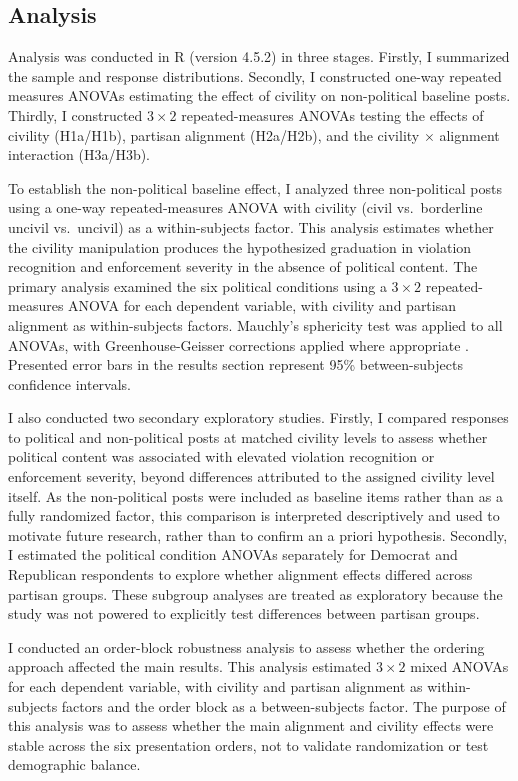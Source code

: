 \documentclass[12pt]{article}
\begin{document}
\subsection{Analysis}

Analysis was conducted in R (version 4.5.2) in three stages. Firstly, I summarized the sample and response distributions. Secondly, I constructed one-way repeated measures ANOVAs estimating the effect of civility on non-political baseline posts. Thirdly, I constructed $3\times2$ repeated-measures ANOVAs testing the effects of civility (H1a/H1b), partisan alignment (H2a/H2b), and the civility $\times$ alignment interaction (H3a/H3b).

To establish the non-political baseline effect, I analyzed three non-political posts using a one-way repeated-measures ANOVA with civility (civil vs.\ borderline uncivil vs.\ uncivil) as a within-subjects factor. This analysis estimates whether the civility manipulation produces the hypothesized graduation in violation recognition and enforcement severity in the absence of political content. The primary analysis examined the six political conditions using a $3\times2$ repeated-measures ANOVA for each dependent variable, with civility and partisan alignment as within-subjects factors. Mauchly's sphericity test was applied to all ANOVAs, with Greenhouse-Geisser corrections applied where appropriate \parencite{blancaRepeatedMeasuresANOVA2023}. Presented error bars in the results section represent 95\% between-subjects confidence intervals.

I also conducted two secondary exploratory studies. Firstly, I compared responses to political and non-political posts at matched civility levels to assess whether political content was associated with elevated violation recognition or enforcement severity, beyond differences attributed to the assigned civility level itself. As the non-political posts were included as baseline items rather than as a fully randomized factor, this comparison is interpreted descriptively and used to motivate future research, rather than to confirm an a priori hypothesis. Secondly, I estimated the political condition ANOVAs separately for Democrat and Republican respondents to explore whether alignment effects differed across partisan groups. These subgroup analyses are treated as exploratory because the study was not powered to explicitly test differences between partisan groups.

I conducted an order-block robustness analysis to assess whether the ordering approach affected the main results. This analysis estimated $3\times2$ mixed ANOVAs for each dependent variable, with civility and partisan alignment as within-subjects factors and the order block as a between-subjects factor. The purpose of this analysis was to assess whether the main alignment and civility effects were stable across the six presentation orders, not to validate randomization or test demographic balance.
\end{document}
